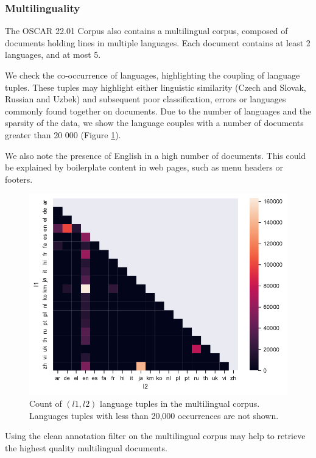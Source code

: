 \subsubsection{Multilinguality}

The OSCAR 22.01 Corpus also contains a multilingual corpus, composed of documents holding lines in multiple languages. Each document contains at least 2 languages, and at most 5.

We check the co-occurrence of languages, highlighting the coupling of language tuples. These tuples may highlight either linguistic similarity (Czech and Slovak, Russian and Uzbek) and subsequent poor classification, errors or languages commonly found together on documents. Due to the number of languages and the sparsity of the data, we show the language couples with a number of documents greater than 20 000 (Figure \ref{multi-confusion}).

We also note the presence of English in a high number of documents. This could be explained by boilerplate content in web pages, such as menu headers or footers.


\begin{figure}[!ht]
    \begin{center}
        \includegraphics[width=0.8\linewidth]{static/media/data/towards/multilingual_big}
        \caption{Count of $(l1, l2)$ language tuples in the multilingual corpus. Languages tuples with less than 20,000 occurrences are not shown.}
        \label{multi-confusion}
    \end{center}
\end{figure}

Using the clean annotation filter on the multilingual corpus may help to retrieve the highest quality multilingual documents.

